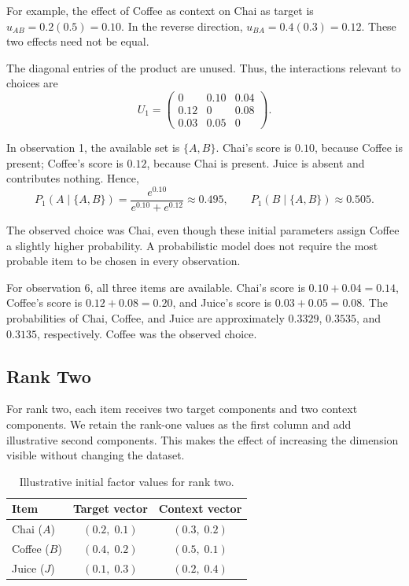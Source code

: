 \documentclass[12pt,oneside]{report}
\begin{document}
For example, the effect of Coffee as context on Chai
as target is $u_{AB}=0.2(0.5)=0.10$. In the reverse
direction, $u_{BA}=0.4(0.3)=0.12$. These two effects
need not be equal.

The diagonal entries of the product are unused. Thus,
the interactions relevant to choices are
\begin{equation}
    U_1=
    \begin{pmatrix}
        0    & 0.10 & 0.04\\
        0.12 & 0    & 0.08\\
        0.03 & 0.05 & 0
    \end{pmatrix}.
    \label{eq:rank-one-example-interactions}
\end{equation}

In observation 1, the available set is $\{A,B\}$.
Chai's score is $0.10$, because Coffee is present;
Coffee's score is $0.12$, because Chai is present.
Juice is absent and contributes nothing. Hence,
\begin{equation}
    P_1(A\mid\{A,B\})
    =\frac{e^{0.10}}{e^{0.10}+e^{0.12}}
    \approx 0.495,
    \qquad
    P_1(B\mid\{A,B\})\approx 0.505.
    \label{eq:rank-one-first-choice}
\end{equation}

The observed choice was Chai, even though these initial
parameters assign Coffee a slightly higher probability.
A probabilistic model does not require the most probable
item to be chosen in every observation.

For observation 6, all three items are available.
Chai's score is $0.10+0.04=0.14$, Coffee's score is
$0.12+0.08=0.20$, and Juice's score is
$0.03+0.05=0.08$. The probabilities of Chai, Coffee,
and Juice are approximately $0.3329$, $0.3535$, and
$0.3135$, respectively. Coffee was the observed choice.

\subsection{Rank Two}

For rank two, each item receives two target components
and two context components. We retain the rank-one
values as the first column and add illustrative second
components. This makes the effect of increasing the
dimension visible without changing the dataset.

\begin{table}[htbp]
    \centering
    \caption{Illustrative initial factor values for rank two.}
    \label{tab:low-rank-two-factors}
    \begin{tabular}{lcc}
        \toprule
        Item & Target vector & Context vector\\
        \midrule
        Chai ($A$)   & $(0.2,\;0.1)$ & $(0.3,\;0.2)$\\
        Coffee ($B$) & $(0.4,\;0.2)$ & $(0.5,\;0.1)$\\
        Juice ($J$)  & $(0.1,\;0.3)$ & $(0.2,\;0.4)$\\
        \bottomrule
    \end{tabular}
\end{table}
\end{document}
